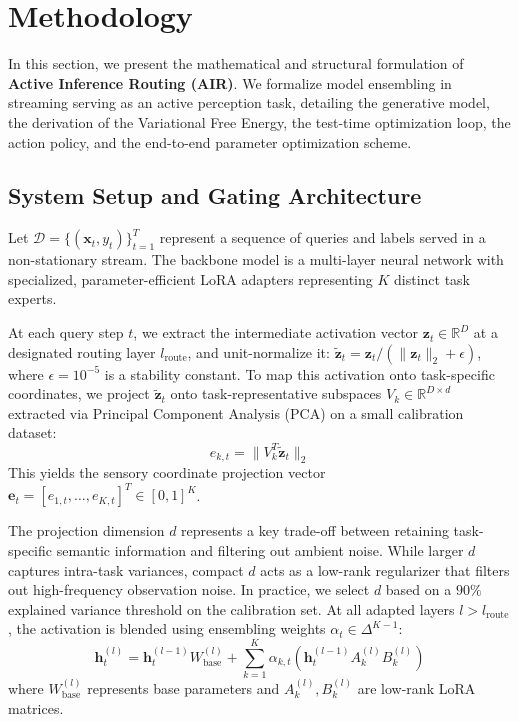 \section{Methodology}
\label{sec:methodology}

In this section, we present the mathematical and structural formulation of \textbf{Active Inference Routing (AIR)}. We formalize model ensembling in streaming serving as an active perception task, detailing the generative model, the derivation of the Variational Free Energy, the test-time optimization loop, the action policy, and the end-to-end parameter optimization scheme.

\subsection{System Setup and Gating Architecture}
Let $\mathcal{D} = \{(\mathbf{x}_t, y_t)\}_{t=1}^T$ represent a sequence of queries and labels served in a non-stationary stream. The backbone model is a multi-layer neural network with specialized, parameter-efficient LoRA adapters \cite{hu2021lora} representing $K$ distinct task experts. 

At each query step $t$, we extract the intermediate activation vector $\mathbf{z}_t \in \mathbb{R}^D$ at a designated routing layer $l_{\text{route}}$, and unit-normalize it: $\tilde{\mathbf{z}}_t = \mathbf{z}_t / (\|\mathbf{z}_t\|_2 + \epsilon)$, where $\epsilon = 10^{-5}$ is a stability constant. To map this activation onto task-specific coordinates, we project $\tilde{\mathbf{z}}_t$ onto task-representative subspaces $V_k \in \mathbb{R}^{D \times d}$ extracted via Principal Component Analysis (PCA) on a small calibration dataset:
\begin{equation}
e_{k, t} = \|V_k^T \tilde{\mathbf{z}}_t\|_2
\end{equation}
This yields the sensory coordinate projection vector $\mathbf{e}_t = [e_{1, t}, \dots, e_{K, t}]^T \in [0, 1]^K$. 

The projection dimension $d$ represents a key trade-off between retaining task-specific semantic information and filtering out ambient noise. While larger $d$ captures intra-task variances, compact $d$ acts as a low-rank regularizer that filters out high-frequency observation noise. In practice, we select $d$ based on a $90\%$ explained variance threshold on the calibration set. At all adapted layers $l > l_{\text{route}}$, the activation is blended using ensembling weights $\alpha_t \in \Delta^{K-1}$:
\begin{equation}
\mathbf{h}_t^{(l)} = \mathbf{h}_t^{(l-1)} W_{\text{base}}^{(l)} + \sum_{k=1}^K \alpha_{k, t} \left( \mathbf{h}_t^{(l-1)} A_k^{(l)} B_k^{(l)} \right)
\end{equation}
where $W_{\text{base}}^{(l)}$ represents base parameters and $A_k^{(l)}, B_k^{(l)}$ are low-rank LoRA matrices.

